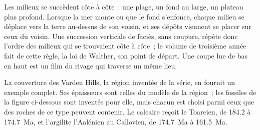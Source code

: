Les milieux se succèdent côte à côte~: une plage, un fond au large, un plateau plus profond.
Lorsque la mer monte ou que le fond s'enfonce, chaque milieu se déplace vers la terre
au-dessus de son voisin, et ses dépôts viennent se placer sur ceux du voisin. Une succession
verticale de faciès, sans coupure, répète donc l'ordre des milieux qui se trouvaient
côte à côte~; le volume de troisième année fait de cette règle, la loi de Walther, son point
de départ. Une coupe lue de bas en haut est un film du rivage qui traverse un même lieu.

La couverture des Varden Hills, la région inventée de la série, en fournit un exemple
complet. Ses épaisseurs sont celles du modèle de la région~; les fossiles de la figure
ci-dessous sont inventés pour elle, mais chacun est choisi parmi ceux que des roches de
ce type peuvent contenir. Le calcaire reçoit le Toarcien, de 184.2 à \qty{174.7}{Ma},
et l'argilite l'Aalénien au Callovien, de \qty{174.7}{Ma} à \qty{161.5}{Ma}.

